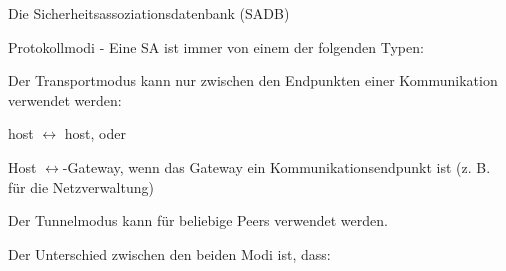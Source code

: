 \documentclass[a4paper]{article}
\begin{document}
\begin{multicols}{3}
\begin{itemize*}
\begin{itemize*}
\begin{itemize*}
                        \item Die Sicherheitsassoziationsdatenbank (SADB)
                  \end{itemize*}
            \end{itemize*}
            \item Protokollmodi - Eine SA ist immer von einem der folgenden Typen:
            \begin{itemize*}
                  \item Der Transportmodus kann nur zwischen den Endpunkten einer Kommunikation verwendet werden:
                  \begin{itemize*}
                        \item host $\leftrightarrow$ host, oder
                        \item Host $\leftrightarrow$-Gateway, wenn das Gateway ein Kommunikationsendpunkt ist (z. B. für die Netzverwaltung)
                  \end{itemize*}
                  \item Der Tunnelmodus kann für beliebige Peers verwendet werden.
            \end{itemize*}
      \end{itemize*}

      Der Unterschied zwischen den beiden Modi ist, dass:


\end{multicols}
\end{document}

